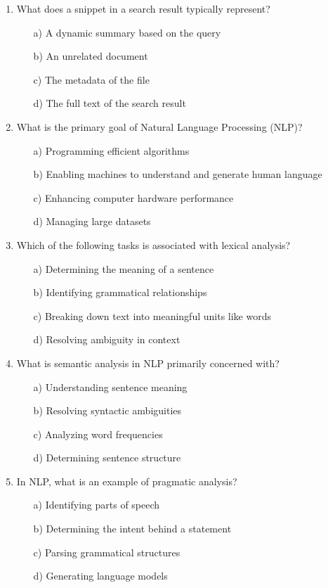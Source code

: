 \documentclass[8pt]{extarticle}
\begin{document}
\begin{multicols}{2}
\begin{enumerate}
\item What does a snippet in a search result typically represent?
\begin{itemize}
    \item[a)] A dynamic summary based on the query
    \item[b)] An unrelated document
    \item[c)] The metadata of the file
    \item[d)] The full text of the search result
\end{itemize}


\item What is the primary goal of Natural Language Processing (NLP)?
\begin{itemize}
    \item[a)] Programming efficient algorithms
    \item[b)] Enabling machines to understand and generate human language
    \item[c)] Enhancing computer hardware performance
    \item[d)] Managing large datasets
\end{itemize}

\item Which of the following tasks is associated with lexical analysis?
\begin{itemize}
    \item[a)] Determining the meaning of a sentence
    \item[b)] Identifying grammatical relationships
    \item[c)] Breaking down text into meaningful units like words
    \item[d)] Resolving ambiguity in context
\end{itemize}

\item What is semantic analysis in NLP primarily concerned with?
\begin{itemize}
    \item[a)] Understanding sentence meaning
    \item[b)] Resolving syntactic ambiguities
    \item[c)] Analyzing word frequencies
    \item[d)] Determining sentence structure
\end{itemize}

\item In NLP, what is an example of pragmatic analysis?
\begin{itemize}
    \item[a)] Identifying parts of speech
    \item[b)] Determining the intent behind a statement
    \item[c)] Parsing grammatical structures
    \item[d)] Generating language models
\end{itemize}


\end{enumerate}
\end{multicols}
\end{document}
